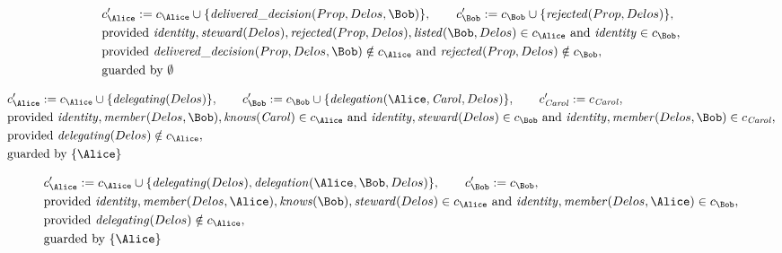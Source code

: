 \begin{align*}
&
c'_
{
\Alice
}
 := 
c_
{
\Alice
}
 \cup 
\{
\mathit{\detokenize{
delivered_decision
}}
(
Prop
,
Delos
,
\Bob
)
\}
, \qquad 
c'_
{
\Bob
}
 := 
c_
{
\Bob
}
 \cup 
\{
\mathit{\detokenize{
rejected
}}
(
Prop
,
Delos
)
\}
,\\
&
\text{provided } 
\mathit{\detokenize{
identity
}}
,
\mathit{\detokenize{
steward
}}
(
Delos
)
,
\mathit{\detokenize{
rejected
}}
(
Prop
,
Delos
)
,
\mathit{\detokenize{
listed
}}
(
\Bob
,
Delos
)
 \in c_
{
\Alice
}
 \text{ and } 
\mathit{\detokenize{
identity
}}
 \in c_
{
\Bob
}
,\\
&
\text{provided } 
\mathit{\detokenize{
delivered_decision
}}
(
Prop
,
Delos
,
\Bob
)
 \notin c_
{
\Alice
}
 \text{ and } 
\mathit{\detokenize{
rejected
}}
(
Prop
,
Delos
)
 \notin c_
{
\Bob
}
,\\
&
\text{guarded by } \emptyset
\end{align*}

\begin{align*}
&
c'_
{
\Alice
}
 := 
c_
{
\Alice
}
 \cup 
\{
\mathit{\detokenize{
delegating
}}
(
Delos
)
\}
, \qquad 
c'_
{
\Bob
}
 := 
c_
{
\Bob
}
 \cup 
\{
\mathit{\detokenize{
delegation
}}
(
\Alice
,
\mathit{Carol}
,
Delos
)
\}
, \qquad 
c'_
{
\mathit{Carol}
}
 := 
c_
{
\mathit{Carol}
}
,\\
&
\text{provided } 
\mathit{\detokenize{
identity
}}
,
\mathit{\detokenize{
member
}}
(
Delos
,
\Bob
)
,
\mathit{\detokenize{
knows
}}
(
\mathit{Carol}
)
 \in c_
{
\Alice
}
 \text{ and } 
\mathit{\detokenize{
identity
}}
,
\mathit{\detokenize{
steward
}}
(
Delos
)
 \in c_
{
\Bob
}
 \text{ and } 
\mathit{\detokenize{
identity
}}
,
\mathit{\detokenize{
member
}}
(
Delos
,
\Bob
)
 \in c_
{
\mathit{Carol}
}
,\\
&
\text{provided } 
\mathit{\detokenize{
delegating
}}
(
Delos
)
 \notin c_
{
\Alice
}
,\\
&
\text{guarded by } \{
\Alice
\}
\end{align*}

\begin{align*}
&
c'_
{
\Alice
}
 := 
c_
{
\Alice
}
 \cup 
\{
\mathit{\detokenize{
delegating
}}
(
Delos
)
,
\mathit{\detokenize{
delegation
}}
(
\Alice
,
\Bob
,
Delos
)
\}
, \qquad 
c'_
{
\Bob
}
 := 
c_
{
\Bob
}
,\\
&
\text{provided } 
\mathit{\detokenize{
identity
}}
,
\mathit{\detokenize{
member
}}
(
Delos
,
\Alice
)
,
\mathit{\detokenize{
knows
}}
(
\Bob
)
,
\mathit{\detokenize{
steward
}}
(
Delos
)
 \in c_
{
\Alice
}
 \text{ and } 
\mathit{\detokenize{
identity
}}
,
\mathit{\detokenize{
member
}}
(
Delos
,
\Alice
)
 \in c_
{
\Bob
}
,\\
&
\text{provided } 
\mathit{\detokenize{
delegating
}}
(
Delos
)
 \notin c_
{
\Alice
}
,\\
&
\text{guarded by } \{
\Alice
\}
\end{align*}
